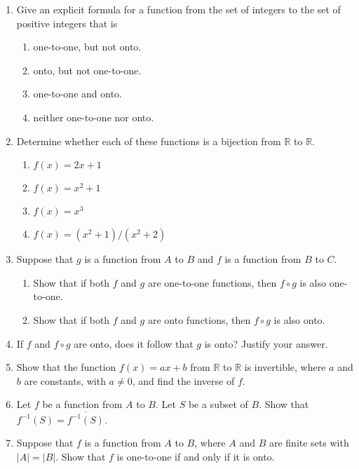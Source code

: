 \documentclass{../../cls/sig-alternate-05-2015}
\begin{document}
\begin{enumerate}
\item Give an explicit formula for a function from the set of
integers to the set of positive integers that is
	\begin{enumerate}
	\item one-to-one, but not onto.
	\item onto, but not one-to-one.
	\item one-to-one and onto.
	\item neither one-to-one nor onto.
	\end{enumerate}

\item Determine whether each of these functions is a bijection
from $\mathbb{R}$ to $\mathbb{R}$.
	\begin{enumerate}
		\item $f(x)=2x+1$
		\item $f(x)=x^2+1$
		\item $f(x)=x^3$
		\item $f(x)=(x^2+1)/(x^2+2)$
	\end{enumerate}

\item 
Suppose that $g$ is a function from $A$ to $B$ and $f$ is a
function from $B$ to $C$.
	\begin{enumerate}
		\item Show that if both $f$ and $g$ are one-to-one functions,
		then $f\circ g$ is also one-to-one.
		
		\item Show that if both $f$ and $g$ are onto functions, then
		$f \circ  g$ is also onto.
	\end{enumerate}
	
\item If $f$ and $f \circ g$ are onto, does it follow that $g$ is onto?
Justify your answer.

\item Show that the function $f (x) = ax + b$ from  $\mathbb{R}$ to  $\mathbb{R}$ is
invertible, where $a$ and $b$ are constants, with $a\neq 0$, and
find the inverse of $f$.

\item Let $f$ be a function from $A$ to $B$. Let $S$ be a subset of $B$.
Show that $f^{-1}(S)=\overline{f^{-1}(S)}$.

\item Suppose that $f$ is a function from $A$ to $B$, where $A$ and $B$
are finite sets with $|A| = |B|$. Show that $f$ is one-to-one
if and only if it is onto.


\end{enumerate}
\end{document}
